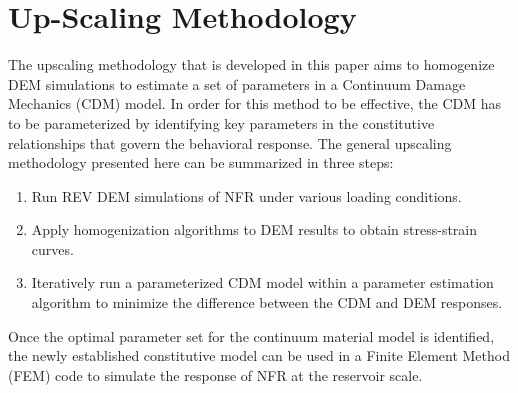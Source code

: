 \section{Up-Scaling Methodology}
The upscaling methodology that is developed in this paper aims to homogenize DEM simulations to estimate a set of parameters in a Continuum Damage Mechanics (CDM) model. In order for this method to be effective, the CDM has to be parameterized by identifying key parameters in the constitutive relationships that govern the behavioral response. The general upscaling methodology presented here can be summarized in three steps:
\begin{enumerate}
	\item Run REV DEM simulations of NFR under various loading conditions.
	\item Apply homogenization algorithms to DEM results to obtain stress-strain curves.
	\item Iteratively run a parameterized CDM model within a parameter estimation algorithm to minimize the difference between the CDM and DEM responses.
\end{enumerate}
Once the optimal parameter set for the continuum material model is identified, the newly established constitutive model can be used in a Finite Element Method (FEM) code to simulate the response of NFR at the reservoir scale.
